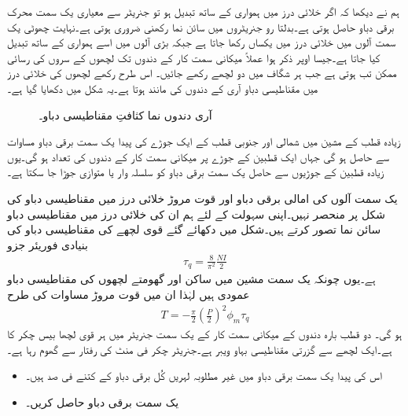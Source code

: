 ہم نے دیکھا کہ اگر خلائی درز میں  ہمواری کے ساتھ تبدیل ہو تو جنریٹر سے معیاری یک سمت  محرک برقی دباو حاصل ہوتی ہے۔بدلتا رو جنریٹروں میں  سائن نما رکھنی ضروری ہوتی ہے۔نہایت چھوٹی یک سمت  آلوں میں خلائی درز میں   یکساں رکھا جاتا ہے جبکہ بڑی آلوں میں اسے ہمواری کے ساتھ تبدیل کیا جاتا ہے۔جیسا اوپر ذکر ہوا عملاً میکانی سمت کار کے دندوں تک لچھوں کے سروں کی رسائی ممکن تب ہوتی ہے جب ہر شگاف میں دو لچھے رکھے جائیں۔ اس طرح رکھے لچھوں کی خلائی درز میں مقناطیسی دباو آری کے دندوں کی مانند ہوتا ہے۔یہ شکل   میں دکھایا گیا ہے۔
\begin{figure}
\centering
\caption{آری دندوں نما کثافتِ مقناطیسی دباو۔}
\label{شکل_یکسمتی_آری_دندوں_نما_دباو}
\end{figure}

زیادہ قطب کے مشین میں شمالی اور جنوبی قطب کے ایک جوڑے کی پیدا یک سمت  برقی دباو مساوات   سے حاصل ہو گی جہاں  ایک قطبین کے جوڑے پر میکانی سمت کار کے دندوں کی تعداد ہو گی۔یوں زیادہ قطبین کے جوڑیوں سے حاصل یک سمت  برقی دباو کو سلسلہ وار یا متوازی جوڑا جا سکتا ہے۔

یک سمت  آلوں کی امالی برقی دباو اور قوت مروڑ خلائی درز میں مقناطیسی دباو کی شکل پر منحصر نہیں۔اپنی سہولت کے لئے ہم ان کی خلائی درز میں مقناطیسی دباو سائن نما تصور کرتے ہیں۔شکل   میں دکھائے گئے قوی لچھے کی مقناطیسی دباو کی بنیادی فوریئر جزو
\begin{align}
\tau_q=\frac{8}{\pi^2} \frac{N I}{2}
\end{align}
ہے۔یوں چونکہ یک سمت  مشین میں ساکن اور گھومتے لچھوں کی مقناطیسی دباو عمودی ہیں لہٰذا ان میں قوت مروڑ مساوات   کی طرح
\begin{align}\label{مساوات_یکسمتی_مروڑ}
T=-\frac{\pi}{2}\left( \frac{P}{2}\right)^2 \phi_m \tau_q 
\end{align} 
ہو گی۔
%
دو قطب بارہ دندوں کے میکانی سمت کار کے یک سمت  جنریٹر میں ہر قوی لچھا بیس چکر کا ہے۔ایک لچھے سے گزرتی مقناطیسی بہاو   ویبر ہے۔جنریٹر  چکر فی منٹ کی رفتار سے گھوم رہا ہے۔
\begin{itemize}
\item
اس کی پیدا یک سمت  برقی دباو میں غیر مطلوبہ لہریں کُل برقی دباو کے کتنے فی صد ہیں۔
\item
یک سمت  برقی دباو حاصل کریں۔
\end{itemize}

